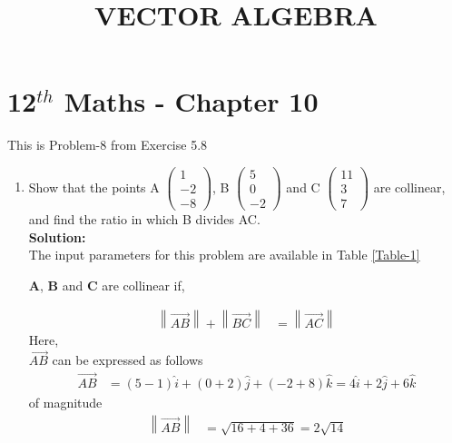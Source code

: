 \documentclass[12pt]{article}
\providecommand{\norm}[1]{\left\lVert#1\right\rVert}
\newcommand{\solution}{\noindent \textbf{Solution: }}
\newcommand{\myvec}[1]{\ensuremath{\begin{pmatrix}#1\end{pmatrix}}}
\let\vec\mathbf
\begin{document}
\begin{center}
\title{\textbf{VECTOR ALGEBRA}}
\date{\vspace{-5ex}} %
\maketitle
\end{center}

\setcounter{page}{1}

\section*{12$^{th}$ Maths - Chapter 10}

This is Problem-8 from Exercise 5.8

 
\begin{enumerate}

	\item Show that the points A $\myvec{1\\-2\\-8}$, B $\myvec{5\\0\\-2}$ and C $\myvec{11\\3\\7}$ are collinear, and find the ratio in which B divides AC.\\


\solution \\The input parameters for this problem are available in Table \ref{Table-1}
\begin{table}[ht!]

\caption{}
\label{Table-1}	

\end{table}

		$\vec{A}$, $\vec{B}$ and $\vec{C}$ are collinear if,

\begin{align}
	\norm{\overrightarrow{AB}}+\norm{\overrightarrow{BC}} &= 
	\norm{\overrightarrow{AC}}
\end{align}
	Here,\\

		$\overrightarrow{AB}$ can be expressed as follows\\
		\begin{align}
			\overrightarrow{AB} &=
			(5-1)\hat{i}+(0+2)\hat{j}+(-2+8)\hat{k} =
		4\hat{i}+2\hat{j}+6\hat{k}
		\end{align}
	of magnitude  \\
		\begin{align} 
		\norm{\overrightarrow{AB}} &=
			\sqrt{16+4+36} =
		2\sqrt{14}
		\end{align}


\end{enumerate}
\end{document}
